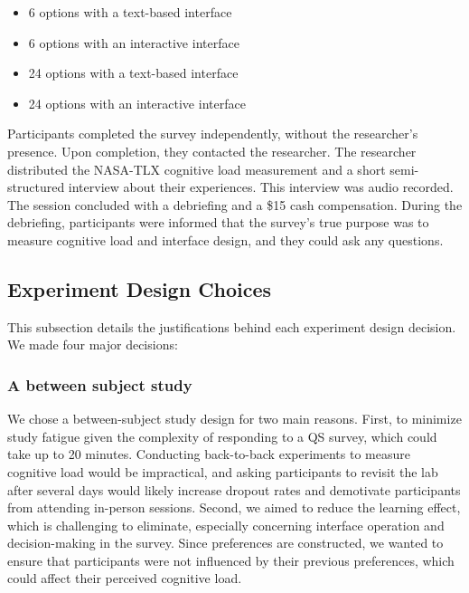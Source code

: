 \begin{itemize}
    \item 6 options with a text-based interface
    \item 6 options with an interactive interface
    \item 24 options with a text-based interface
    \item 24 options with an interactive interface
\end{itemize}

Participants completed the survey independently, without the researcher's presence. Upon completion, they contacted the researcher. The researcher distributed the NASA-TLX cognitive load measurement and a short semi-structured interview about their experiences. This interview was audio recorded. The session concluded with a debriefing and a \$15 cash compensation. During the debriefing, participants were informed that the survey's true purpose was to measure cognitive load and interface design, and they could ask any questions.

\subsection{Experiment Design Choices}
This subsection details the justifications behind each experiment design decision. We made four major decisions:

\subsubsection{A between subject study}
We chose a between-subject study design for two main reasons. First, to minimize study fatigue given the complexity of responding to a QS survey, which could take up to 20 minutes. Conducting back-to-back experiments to measure cognitive load would be impractical, and asking participants to revisit the lab after several days would likely increase dropout rates and demotivate participants from attending in-person sessions. Second, we aimed to reduce the learning effect, which is challenging to eliminate, especially concerning interface operation and decision-making in the survey. Since preferences are constructed, we wanted to ensure that participants were not influenced by their previous preferences, which could affect their perceived cognitive load.

